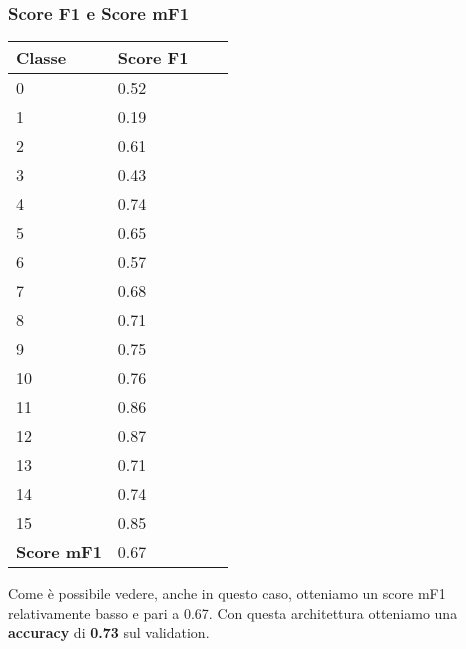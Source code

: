 \subsubsection{Score F1 e Score mF1}
\begin{center}
	\begin{tabular}{| l | l | l | l |}
		\hline
		Classe & Score F1 \\ \hline
		0 & 0.52 \\ \hline
		1 & 0.19 \\ \hline
		2 & 0.61 \\ \hline
		3 & 0.43\\ \hline
		4 & 0.74 \\ \hline
		5 & 0.65\\ \hline
		6 & 0.57 \\ \hline
		7 & 0.68\\ \hline
		8 & 0.71 \\ \hline
		9 & 0.75\\ \hline
		10 & 0.76 \\ \hline
		11 & 0.86 \\ \hline
		12 & 0.87 \\ \hline
		13 & 0.71 \\ \hline
		14 & 0.74\\ \hline
		15 & 0.85 \\ \hline 
		{\bf Score mF1} & 0.67 \\ \hline							
	\end{tabular}
\end{center}
Come è possibile vedere, anche in questo caso, otteniamo un score mF1 relativamente basso e pari a 0.67.
\newline
Con questa architettura otteniamo una {\bf accuracy} di {\bf 0.73} sul validation. 

